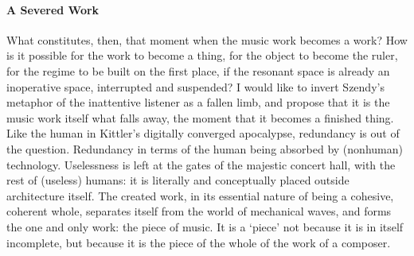 





\paragraph{A Severed Work}
What constitutes, then, that moment when the music work becomes a work? How is it possible for the work to become a thing, for the object to become the ruler, for the regime to be built on the first place, if the resonant space is already an inoperative space, interrupted and suspended? I would like to invert Szendy's metaphor of the inattentive listener as a fallen limb, and propose that it is the music work itself what falls away, the moment that it becomes a finished thing. Like the human in Kittler's digitally converged apocalypse, redundancy is out of the question. Redundancy in terms of the human being absorbed by (nonhuman) technology. Uselessness is left at the gates of the majestic concert hall, with the rest of (useless) humans: it is literally and conceptually placed outside architecture itself. The created work, in its essential nature of being a cohesive, coherent whole, separates itself from the world of mechanical waves, and forms the one and only work: the piece of music. It is a `piece' not because it is in itself incomplete, but because it is the piece of the whole of the work of a composer.




